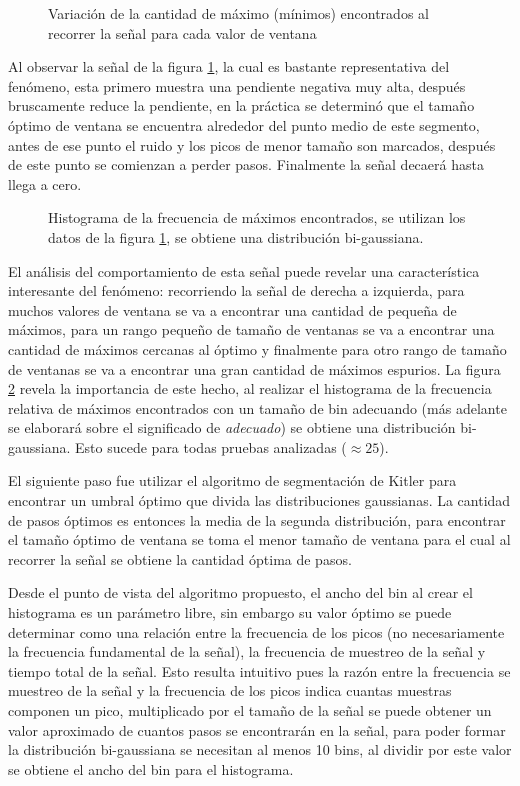 \begin{figure}
    \centering
    
    \caption{Variación de la cantidad de máximo (mínimos) encontrados al recorrer la señal para cada valor de ventana}
    \label{fig:ventana}
\end{figure}

Al observar la señal de la figura \ref{fig:ventana}, la cual es bastante representativa del fenómeno, esta primero muestra una pendiente negativa muy alta, después bruscamente reduce la pendiente, en la práctica se determinó que el tamaño óptimo de ventana se encuentra alrededor del punto medio de este segmento, antes de ese punto el ruido y los picos de menor tamaño son marcados, después de este punto se comienzan a perder pasos. Finalmente la señal decaerá hasta llega a cero.

\begin{figure}
    \centering
    
    \caption{Histograma de la frecuencia de máximos encontrados, se utilizan los datos de la figura \ref{fig:ventana}, se obtiene una distribución bi-gaussiana.}
    \label{fig:histograma}
\end{figure}

El análisis del comportamiento de esta señal puede revelar una característica interesante del fenómeno: recorriendo la señal de derecha a izquierda, para muchos valores de ventana se va a encontrar una cantidad de pequeña de máximos, para un rango pequeño de tamaño de ventanas se va a encontrar una cantidad de máximos cercanas al óptimo y finalmente para otro rango de tamaño de ventanas se va a encontrar una gran cantidad de máximos espurios. La figura \ref{fig:histograma} revela la importancia de este hecho, al realizar el histograma de la frecuencia relativa de máximos encontrados con un tamaño de bin adecuando (más adelante se elaborará sobre el significado de \emph{adecuado}) se obtiene una distribución bi-gaussiana. Esto sucede para todas pruebas analizadas ($\approx 25$). 

El siguiente paso fue utilizar el algoritmo de segmentación de Kitler para encontrar un umbral óptimo que divida las distribuciones gaussianas. La cantidad de pasos óptimos es entonces la media de la segunda distribución, para encontrar el tamaño óptimo de ventana se toma el menor tamaño de ventana para el cual al recorrer la señal se obtiene la cantidad óptima de pasos. 

Desde el punto de vista del algoritmo propuesto, el ancho del bin al crear el histograma es un parámetro libre, sin embargo su valor óptimo se puede determinar como una relación entre la frecuencia de los picos (no necesariamente la frecuencia fundamental de la señal), la frecuencia de muestreo de la señal y tiempo total de la señal. Esto resulta intuitivo pues la razón entre la frecuencia se muestreo de la señal y la frecuencia de los picos indica cuantas muestras componen un pico, multiplicado por el tamaño de la señal se puede obtener un valor aproximado de cuantos pasos se encontrarán en la señal, para poder formar la distribución bi-gaussiana se necesitan al menos 10 bins, al dividir por este valor se obtiene el ancho del bin para el histograma.


